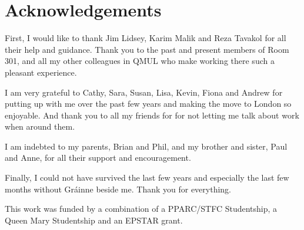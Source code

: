 \renewcommand{\CVSrevision}{\version$Id: acknowledgements.tex,v 1.6 2009/11/30 14:48:03 ith Exp $}
% 
% 
\chapter*{Acknowledgements}
\label{ch:acknowledgements}

First, I would like to thank Jim Lidsey, Karim Malik and Reza Tavakol for all their help and
guidance. Thank you to the past and present members of Room 301, and all my other colleagues in
QMUL who make working there such a pleasant experience.

I am very grateful to Cathy, Sara, Susan, Lisa, Kevin, Fiona and Andrew for putting up with me over
the past few years and making the move to London so enjoyable. And thank you to all my friends for
for not letting me talk about work when around them.

I am indebted to my parents, Brian and Phil, and my brother and sister, Paul and Anne, for all
their support and encouragement. 

Finally, I could not have survived the last few years and especially the last few months without 
Gr\'{a}inne beside me. Thank you for everything.

\vfill

This work was funded by a combination of a PPARC/STFC Studentship, a Queen Mary Studentship and an
EPSTAR grant.  


